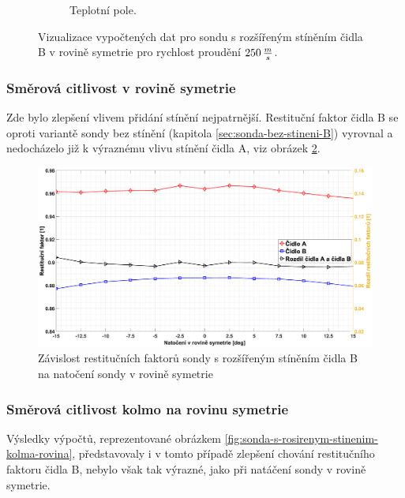 \begin{figure}[ht!]
\begin{subfigure}{0.45\textwidth}
                    \caption{Teplotní pole.}
                \end{subfigure}
                \caption{Vizualizace vypočtených dat pro sondu s rozšířeným stíněním čidla B v rovině symetrie pro rychlost proudění $250 \, \frac{m}{s}$.}
                \label{fig:sonda-s-rozsirenym-stinenim-B-vizualizace}
            \end{figure}
        \newpage
        \subsubsection{Směrová citlivost v rovině symetrie}
            Zde bylo zlepšení vlivem přidání stínění nejpatrnější. Restituční faktor čidla B se oproti variantě sondy bez stínění (kapitola \ref{sec:sonda-bez-stineni-B}) vyrovnal a nedocházelo již k výraznému vlivu stínění čidla A, viz obrázek \ref{fig:sonda-s-rosirenym-stinenim-rovina-symetrie}.
            
            \begin{figure}[ht!]
                \centering
                \includegraphics*[width=\textwidth, trim={5.9cm 1.0cm 2.7cm 2.0cm}]{400_SIMULACE_KONSTRUKCNICH_UPRAV/Grafy/03_rovina_symetrie}
                \caption{Závislost restitučních faktorů sondy s rozšířeným stíněním čidla B na natočení sondy v rovině symetrie}
                \label{fig:sonda-s-rosirenym-stinenim-rovina-symetrie}
            \end{figure}
        \subsubsection{Směrová citlivost kolmo na rovinu symetrie}
            Výsledky výpočtů, reprezentované obrázkem \ref{fig:sonda-s-rosirenym-stinenim-kolma-rovina}, představovaly i v tomto případě zlepšení chování restitučního faktoru čidla B, nebylo však tak výrazné, jako při natáčení sondy v rovině symetrie.
            
